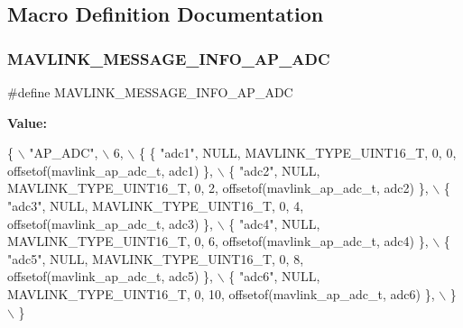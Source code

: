 \subsection{Macro Definition Documentation}
\mbox{\label{mavlink__msg__ap__adc_8h_a93da0b7c9072f59a74260f78a4940cb8}} 
\subsubsection{M\+A\+V\+L\+I\+N\+K\+\_\+\+M\+E\+S\+S\+A\+G\+E\+\_\+\+I\+N\+F\+O\+\_\+\+A\+P\+\_\+\+A\+DC}
{\footnotesize\ttfamily \#define M\+A\+V\+L\+I\+N\+K\+\_\+\+M\+E\+S\+S\+A\+G\+E\+\_\+\+I\+N\+F\+O\+\_\+\+A\+P\+\_\+\+A\+DC}

{\bfseries Value\+:}
\begin{DoxyCode}
\{ \(\backslash\)
    \textcolor{stringliteral}{"AP\_ADC"}, \(\backslash\)
    6, \(\backslash\)
    \{  \{ \textcolor{stringliteral}{"adc1"}, NULL, MAVLINK_TYPE_UINT16_T, 0, 0, offsetof(mavlink_ap_adc_t, adc1) \}, \(\backslash\)
         \{ \textcolor{stringliteral}{"adc2"}, NULL, MAVLINK_TYPE_UINT16_T, 0, 2, offsetof(mavlink_ap_adc_t, adc2) \}, \(\backslash\)
         \{ \textcolor{stringliteral}{"adc3"}, NULL, MAVLINK_TYPE_UINT16_T, 0, 4, offsetof(mavlink_ap_adc_t, adc3) \}, \(\backslash\)
         \{ \textcolor{stringliteral}{"adc4"}, NULL, MAVLINK_TYPE_UINT16_T, 0, 6, offsetof(mavlink_ap_adc_t, adc4) \}, \(\backslash\)
         \{ \textcolor{stringliteral}{"adc5"}, NULL, MAVLINK_TYPE_UINT16_T, 0, 8, offsetof(mavlink_ap_adc_t, adc5) \}, \(\backslash\)
         \{ \textcolor{stringliteral}{"adc6"}, NULL, MAVLINK_TYPE_UINT16_T, 0, 10, offsetof(mavlink_ap_adc_t, adc6) \}, \(\backslash\)
         \} \(\backslash\)
\}
\end{DoxyCode}
\mbox{\label{mavlink__msg__ap__adc_8h_ac3227f8e78076072e6d3ec10c32559a6}} 
